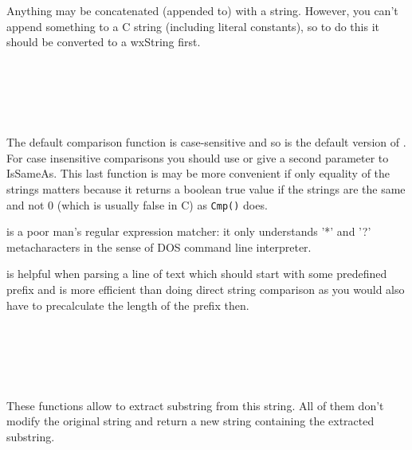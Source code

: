 Anything may be concatenated (appended to) with a string. However, you can't
append something to a C string (including literal constants), so to do this it
should be converted to a wxString first.

\\
\\
\\
\\

\label{comparisoninwxstring}

The default comparison function  is case-sensitive and
so is the default version of . For case
insensitive comparisons you should use  or
give a second parameter to IsSameAs. This last function is may be more
convenient if only equality of the strings matters because it returns a boolean
true value if the strings are the same and not 0 (which is usually false in C)
as {\tt Cmp()} does.

 is a poor man's regular expression matcher:
it only understands '*' and '?' metacharacters in the sense of DOS command line
interpreter.

 is helpful when parsing a line of
text which should start with some predefined prefix and is more efficient than
doing direct string comparison as you would also have to precalculate the
length of the prefix then.

\\
\\
\\
\\

\label{substringextractioninwxstring}

These functions allow to extract substring from this string. All of them don't
modify the original string and return a new string containing the extracted
substring.

\\
\\
\\
\\
\\
\\
\\
\\


